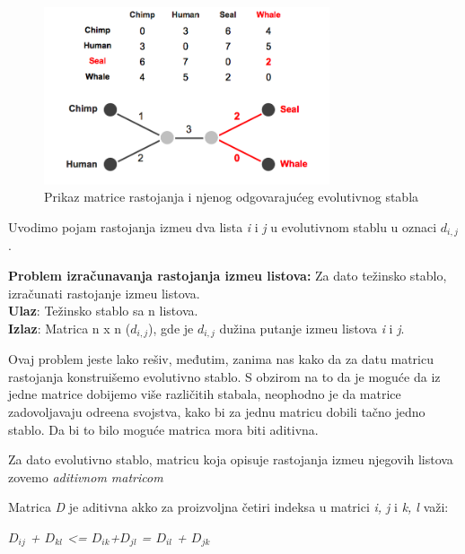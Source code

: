 \begin{figure}[h!]
\begin{center}
\includegraphics[width=0.75\textwidth]{poglavlja/7/slike/slika3.png}
\end{center}
\caption{Prikaz matrice rastojanja i njenog odgovaraju\'ceg evolutivnog stabla}
\label{fig:pmrioes}
\end{figure}


Uvodimo pojam rastojanja izme\dj u dva lista \textit{i} i \textit{j} u evolutivnom stablu u oznaci $d_{i, j}$.
\begin{tcolorbox}
\textbf{Problem izra\v{c}unavanja rastojanja izme\dj u listova:} Za dato te\v{z}insko stablo, izra\v{c}unati rastojanje izme\dj u listova.\\
\textbf{Ulaz}: Te\v{z}insko stablo sa n listova.\\
\textbf{Izlaz}: Matrica n x n ($d_{i, j}$), gde je $d_{i, j}$ du\v{z}ina putanje izme\dj u listova \textit{i} i \textit{j}.
\end{tcolorbox}

Ovaj problem jeste lako re\v{s}iv, međutim, zanima nas kako da za datu matricu rastojanja konstrui\v{s}emo evolutivno stablo. S obzirom na to da je mogu\'ce da iz jedne matrice dobijemo vi\v{s}e razli\v{c}itih stabala, neophodno je da matrice zadovoljavaju odre\dj ena svojstva, kako bi za jednu matricu dobili ta\v{c}no jedno stablo. Da bi to bilo mogu\'ce matrica mora biti aditivna. 

\begin{definicija}
Za dato evolutivno stablo, matricu koja opisuje rastojanja izme\dj u njegovih listova zovemo \textit{aditivnom matricom}
\end{definicija}

\begin{teorema}
Matrica \textit{D} je aditivna akko za proizvoljna \v{c}etiri indeksa u matrici \textit{i, j} i \textit{k, l} va\v{z}i:

\begin{center}
\textit{$D_{ij}$ + $D_{kl}$ \textless= $D_{ik}$+$D_{jl}$ = $D_{il}$ + $D_{jk}$}
\end{center}

\end{teorema}

